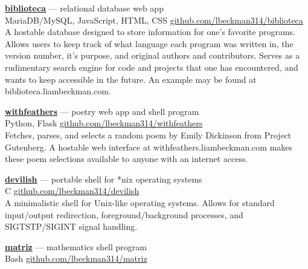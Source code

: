 \documentclass[a4paper]{article}
\begin{document}
\textcolor{my-grey}{\dotfill}
\medbreak

\textcolor{my-blue}{\textbf{\href{https://biblioteca.liambeckman.com}{biblioteca}}} --- relational database web app\\
\textcolor{my-grey}{MariaDB/MySQL, JavaScript, HTML, CSS \hfill \href{https://github.com/lbeckman314/biblioteca}{github.com/lbeckman314/biblioteca}}\\

A hostable database designed to store information for one's favorite programs. Allows users to keep track of what language each program was written in, the version number, it’s purpose, and original authors and contributors. Serves as a rudimentary search engine for code and projects that one has encountered, and wants to keep accessible in the future. An example may be found at \textcolor{my-blue}{biblioteca.liambeckman.com}.

\textcolor{my-grey}{\dotfill}
\medbreak

\textcolor{my-blue}{\textbf{\href{https://withfeathers.liambeckman.com}{withfeathers}}} --- poetry web app and shell program\\
\textcolor{my-grey}{Python, Flask \hfill \href{https://github.com/lbeckman314/withfeathers}{github.com/lbeckman314/withfeathers}}\\

Fetches, parses, and selects a random poem by Emily Dickinson from Project Gutenberg. A hostable web interface at withfeathers.liambeckman.com makes these poem selections available to anyone with an internet access.

\textcolor{my-grey}{\dotfill}
\medbreak

\textcolor{my-blue}{\textbf{\href{https://liambeckman.com/code/devilish}{devilish}}} --- portable shell for *nix operating systems\\
\textcolor{my-grey}{C \hfill \href{https://github.com/lbeckman314/devilish}{github.com/lbeckman314/devilish}}\\

A minimalistic shell for Unix-like operating systems. Allows for standard input/output redirection, foreground/background processes, and SIGTSTP/SIGINT signal handling.

\textcolor{my-grey}{\dotfill}
\medbreak

\textcolor{my-blue}{\textbf{\href{https://liambeckman.com/code/matriz}{matriz}}} --- mathematics shell program\\
\textcolor{my-grey}{Bash \hfill \href{https://github.com/lbeckman314/matriz}{github.com/lbeckman314/matriz}}\\
\end{document}
